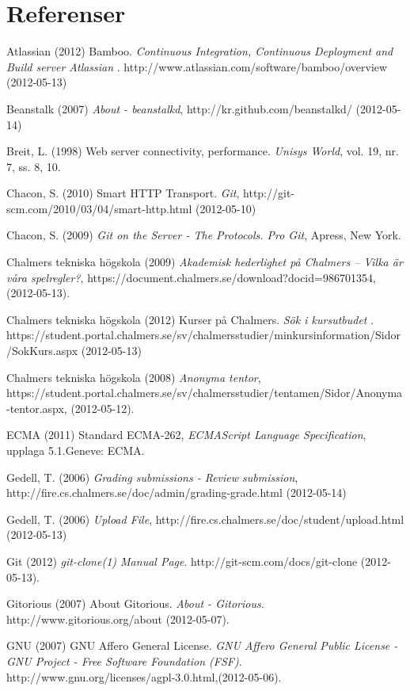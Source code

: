 
\renewcommand{\thechapter}{}
\chapter{Referenser}
\begin{flushleft}
\small
Atlassian (2012) Bamboo. \emph{Continuous Integration, Continuous Deployment and Build server Atlassian  }. http://www.atlassian.com/software/bamboo/overview (2012-05-13)

Beanstalk (2007) \emph{About - beanstalkd}, http://kr.github.com/beanstalkd/ (2012-05-14)

Breit, L. (1998) Web server connectivity, performance. \emph{Unisys World}, vol. 19, nr. 7, ss. 8, 10.

Chacon, S. (2010) Smart HTTP Transport. \emph{Git}, http://git-scm.com/2010/03/04/smart-http.html (2012-05-10)

Chacon, S. (2009) \emph{Git on the Server - The Protocols. Pro Git}, Apress, New York.

Chalmers tekniska högskola (2009) \emph{Akademisk hederlighet på Chalmers – Vilka är våra spelregler?}, https://document.chalmers.se/download?docid=986701354, (2012-05-13).

Chalmers tekniska högskola (2012) Kurser på Chalmers. \emph{Sök i kursutbudet} . https://student.portal.chalmers.se/sv/chalmersstudier/minkursinformation/Sidor/SokKurs.aspx (2012-05-13)

Chalmers tekniska högskola (2008) \emph{Anonyma tentor}, https://student.portal.chalmers.se/sv/chalmersstudier/tentamen/Sidor/Anonyma-tentor.aspx, (2012-05-12).

ECMA (2011) Standard ECMA-262, \emph{ECMAScript Language Specification}, upplaga 5.1.Geneve: ECMA.

Gedell, T. (2006) \emph{Grading submissions - Review submission}, http://fire.cs.chalmers.se/doc/admin/grading-grade.html (2012-05-14)

Gedell, T. (2006) \emph{Upload File}, http://fire.cs.chalmers.se/doc/student/upload.html (2012-05-13)

Git (2012) \emph{git-clone(1) Manual Page}. http://git-scm.com/docs/git-clone (2012-05-13).

Gitorious (2007) About Gitorious. \emph{ About - Gitorious}. http://www.gitorious.org/about (2012-05-07).

GNU (2007) GNU Affero General License. \emph{GNU Affero General Public License - GNU Project - Free Software Foundation (FSF)}. http://www.gnu.org/licenses/agpl-3.0.html,(2012-05-06).


\end{flushleft}
